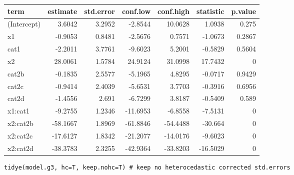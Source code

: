\documentclass[a4paper]{article}
\begin{document}
\begin{center}
\begin{tabular}{lrrrrrr}
term & estimate & std.error & conf.low & conf.high & statistic & p.value\\
\hline
(Intercept) & 3.6042 & 3.2952 & -2.8544 & 10.0628 & 1.0938 & 0.275\\
x1 & -0.9053 & 0.8481 & -2.5676 & 0.7571 & -1.0673 & 0.2867\\
cat1 & -2.2011 & 3.7761 & -9.6023 & 5.2001 & -0.5829 & 0.5604\\
x2 & 28.0061 & 1.5784 & 24.9124 & 31.0998 & 17.7432 & 0\\
cat2b & -0.1835 & 2.5577 & -5.1965 & 4.8295 & -0.0717 & 0.9429\\
cat2c & -0.9414 & 2.4039 & -5.6531 & 3.7703 & -0.3916 & 0.6956\\
cat2d & -1.4556 & 2.691 & -6.7299 & 3.8187 & -0.5409 & 0.589\\
x1:cat1 & -9.2755 & 1.2346 & -11.6953 & -6.8558 & -7.5131 & 0\\
x2:cat2b & -58.1667 & 1.8969 & -61.8846 & -54.4488 & -30.664 & 0\\
x2:cat2c & -17.6127 & 1.8342 & -21.2077 & -14.0176 & -9.6023 & 0\\
x2:cat2d & -38.3783 & 2.3255 & -42.9364 & -33.8203 & -16.5029 & 0\\
\end{tabular}
\end{center}


\lstset{numbers=left,language=r,label= ,caption= ,captionpos=b}
\begin{lstlisting}
tidye(model.g3, hc=T, keep.nohc=T) # keep no heterocedastic corrected std.errors
\end{lstlisting}
\end{document}
